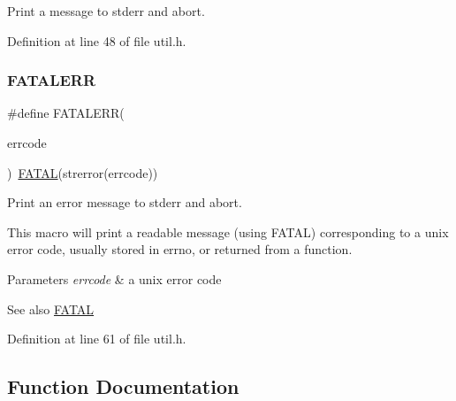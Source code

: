 Print a message to stderr and abort. 



Definition at line 48 of file util.\+h.

\mbox{\label{group__check__macros_gab2b3925a76d34a1272ace73af5a81945}} 
\subsubsection{\texorpdfstring{F\+A\+T\+A\+L\+E\+RR}{FATALERR}}
{\footnotesize\ttfamily \#define F\+A\+T\+A\+L\+E\+RR(\begin{DoxyParamCaption}\item[{}]{errcode }\end{DoxyParamCaption})~\hyperlink{group__check__macros_ga7a3e1d362790a375466c5e77a6d5c9c5}{F\+A\+T\+AL}(strerror(errcode))}



Print an error message to stderr and abort. 

This macro will print a readable message (using {\ttfamily F\+A\+T\+AL}) corresponding to a unix error code, usually stored in {\ttfamily errno}, or returned from a function.


\begin{DoxyParams}{Parameters}
{\em errcode} & a unix error code \\
\hline
\end{DoxyParams}
\begin{DoxySeeAlso}{See also}
\hyperlink{group__check__macros_ga7a3e1d362790a375466c5e77a6d5c9c5}{F\+A\+T\+AL} 
\end{DoxySeeAlso}


Definition at line 61 of file util.\+h.



\subsection{Function Documentation}
\mbox{\label{group__check__macros_ga1d16f442903359e8146370c52297334c}} 
